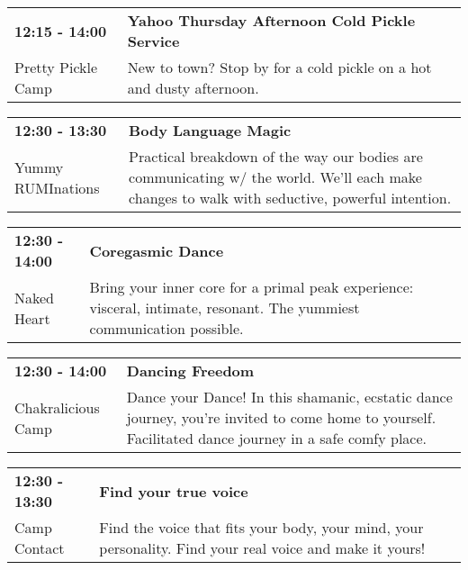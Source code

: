 \begin{tabular}{ p{1in} p{2.2in} }
    \textbf{12:15 - 14:00} & \textbf{Yahoo Thursday Afternoon Cold Pickle Service} \\
    Pretty Pickle Camp \newline  & New to town? Stop by for a cold pickle on a hot and dusty afternoon. \\
    \hline 
\end{tabular}
    
\begin{tabular}{ p{1in} p{2.2in} }
    \textbf{12:30 - 13:30} & \textbf{Body Language Magic} \\
    Yummy RUMInations \newline  & Practical breakdown of the way our bodies are communicating w/ the world.  We'll each make changes to walk with seductive, powerful intention. \\
    \hline 
\end{tabular}
    
\begin{tabular}{ p{1in} p{2.2in} }
    \textbf{12:30 - 14:00} & \textbf{Coregasmic Dance } \\
    Naked Heart \newline  & Bring your inner core for a primal peak experience: visceral, intimate, resonant. The yummiest communication possible. \\
    \hline 
\end{tabular}
    
\begin{tabular}{ p{1in} p{2.2in} }
    \textbf{12:30 - 14:00} & \textbf{Dancing Freedom} \\
    Chakralicious Camp \newline  & Dance your Dance! In this shamanic, ecstatic dance journey, you're invited to come home to yourself. Facilitated dance journey in a safe comfy place. \\
    \hline 
\end{tabular}
    
\begin{tabular}{ p{1in} p{2.2in} }
    \textbf{12:30 - 13:30} & \textbf{Find your true voice} \\
    Camp Contact \newline  & Find the voice that fits your body, your mind, your personality. Find your real voice and make it yours! \\
    \hline 
\end{tabular}
    
